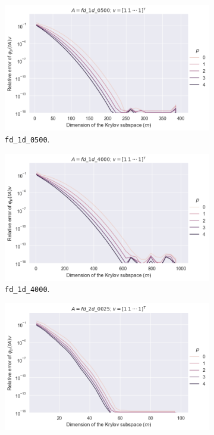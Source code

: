 \begin{figure}[h!]
    \centering
    \begin{subfigure}[b]{0.45\textwidth}
        \includegraphics[width=\textwidth]{img/krylovunivariate/fd_1d_0500.png}
        \caption{\texttt{fd\_1d\_0500}.}
    \end{subfigure}
    \hfill
    \begin{subfigure}[b]{0.45\textwidth}
        \includegraphics[width=\textwidth]{img/krylovunivariate/fd_1d_4000.png}
        \caption{\texttt{fd\_1d\_4000}.}
    \end{subfigure}
    \vfill
    \begin{subfigure}[b]{0.45\textwidth}
        \includegraphics[width=\textwidth]{img/krylovunivariate/fd_2d_0025.png}

\end{subfigure}
\end{figure}
